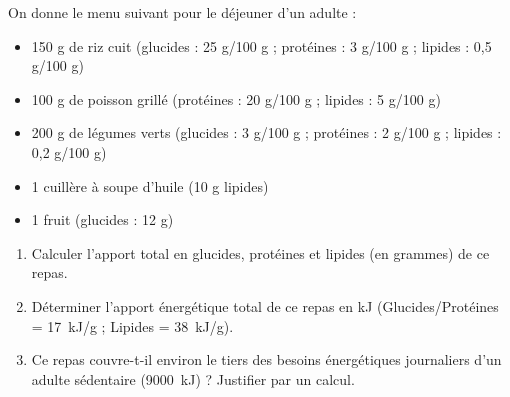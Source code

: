\documentclass[11pt]{article}
\begin{document}
\begin{exercice}
On donne le menu suivant pour le déjeuner d'un adulte : 
\begin{itemize}
    \item 150 g de riz cuit (glucides : 25 g/100 g ; protéines : 3 g/100 g ; lipides : 0,5 g/100 g)
    \item 100 g de poisson grillé (protéines : 20 g/100 g ; lipides : 5 g/100 g)
    \item 200 g de légumes verts (glucides : 3 g/100 g ; protéines : 2 g/100 g ; lipides : 0,2 g/100 g)
    \item 1 cuillère à soupe d'huile (10 g lipides)
    \item 1 fruit (glucides : 12 g)
\end{itemize}
\begin{enumerate}
    \item Calculer l'apport total en glucides, protéines et lipides (en grammes) de ce repas.
    \item Déterminer l'apport énergétique total de ce repas en kJ (Glucides/Protéines = \SI{17}{\kilo\joule/g} ; Lipides = \SI{38}{\kilo\joule/g}).
    \item Ce repas couvre-t-il environ le tiers des besoins énergétiques journaliers d'un adulte sédentaire (\SI{9000}{\kilo\joule}) ? Justifier par un calcul.
\end{enumerate}
\end{exercice}
\end{document}
